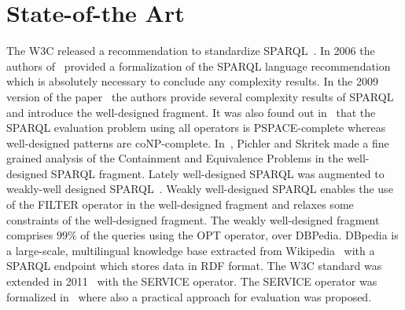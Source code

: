 \section{State-of-the Art}
The W3C released a recommendation to standardize SPARQL~\cite{w3standardold}. 
In 2006 the authors of~\cite{perez2006semantics} provided a formalization of the SPARQL
language recommendation which is absolutely necessary to conclude any complexity results. 
In the 2009 version of the paper~\cite{perez2009semantics} the authors
provide several complexity results of SPARQL and introduce the
well-designed fragment. It was also found out in~\cite{perez2009semantics} that
the SPARQL evaluation problem using all operators is PSPACE-complete whereas well-designed patterns are
coNP-complete. In~\cite{pichler2014containment}, Pichler and Skritek made a fine
grained analysis of the Containment and Equivalence Problems in the
well-designed SPARQL fragment. Lately well-designed SPARQL was augmented to
weakly-well designed SPARQL~\cite{kaminski_bwd}. Weakly well-designed
SPARQL enables the use of the FILTER operator in the well-designed fragment and
relaxes some constraints of the well-designed fragment. The weakly well-designed
fragment comprises $99\%$ of the queries using the OPT operator, over DBPedia.
DBpedia is a large-scale, multilingual knowledge base extracted from
Wikipedia~\cite{lehmann2015dbpedia} with a SPARQL endpoint which stores data in
RDF format.
The W3C standard was extended in 2011~\cite{w3standard} with the SERVICE
operator. The SERVICE operator was formalized in~\cite{builaranda20131} where
also a practical approach for evaluation was proposed. 
